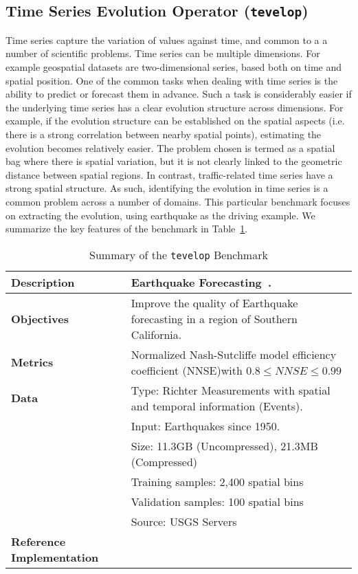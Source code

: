 \subsection{Time Series Evolution Operator ({\tt tevelop})}

Time series capture the variation of values against time, and common to a a number of scientific problems. Time series can be multiple dimensions. For example geospatial datasets are two-dimensional series, based both on time and spatial position. One of the common tasks when dealing with time series is the ability to predict or forecast them in advance.  Such a task is considerably easier if the underlying time series has a clear evolution structure across dimensions. For example, if the evolution structure can be established on the spatial aspects (i.e.  there is a  strong correlation between nearby spatial points), estimating the evolution becomes relatively easier. The problem chosen is termed as a spatial bag where there is spatial variation, but it is not clearly linked to the geometric distance
between spatial regions. In contrast, traffic-related time series have a
strong spatial structure. As such, identifying the evolution in time series is a common problem across a number of domains. This particular benchmark focuses on extracting the evolution, using earthquake as the driving example. We summarize the key features of the benchmark  in Table~\ref{tab:eq-summary}.

\begin{small}
\begin{table}
\caption{Summary of the {\tt tevelop} Benchmark}\label{tab:eq-summary}
\begin{center}
\begin{tabular}{p{}p{}}
\hline
\hline
{\bf Description} & Earthquake Forecasting~\cite{fox2022-jm,TFT-21,eq-code,eq-data}.\\
\hline
{\bf Objectives} &  Improve the quality of Earthquake
forecasting in a region of Southern California.\\
\hline
{\bf Metrics} & Normalized Nash-Sutcliffe model efficiency coefficient (NNSE)with $0.8\leq NNSE\leq 0.99$\\
\hline
{\bf Data}  & Type:  Richter Measurements with spatial and temporal information (Events). \\
  &  Input:  Earthquakes since 1950.\\
  &  Size:  11.3GB (Uncompressed), 21.3MB (Compressed)\\
  & Training samples: 2,400 spatial bins\\
  & Validation samples:   100 spatial bins\\
  & Source:  USGS Servers~\cite{eq-data}\\
\hline
{\bf Reference Implementation} & \cite{eq-code}\\
\hline
\end{tabular}
\end{center}
\end{table}
\end{small}

